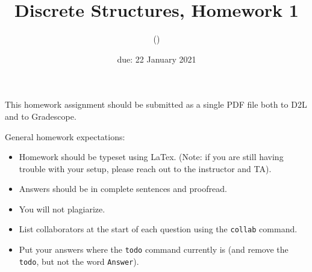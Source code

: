 \documentclass{article}
\title{Discrete Structures, Homework 1}
\author{\todo{Your Name Here} (\todo{your discord handle here})}
\date{due: 22 January 2021}
\begin{document}
\maketitle

This homework assignment should be
submitted as a single PDF file both to D2L and to Gradescope.

General homework expectations:
\begin{itemize}
    \item Homework should be typeset using LaTex.  (Note: if you are still
        having trouble with your setup, please reach out to the instructor and
        TA).
    \item Answers should be in complete sentences and proofread.
    \item You will not plagiarize.
    \item List collaborators at the start of each question using the
        \texttt{collab} command.
    \item Put your answers where the \texttt{todo} command currently is (and
        remove the \texttt{todo}, but not the word \texttt{Answer}).
\end{itemize}

\end{document}
